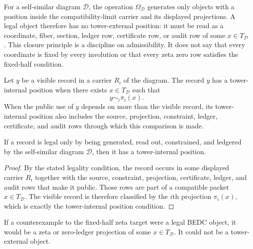 \begin{principle}
\label{prin:full-constraint-self-similar-closure}
For a self-similar diagram $\mathcal D$, the operation
$\Omega_{\mathcal D}$ generates only objects with a position inside the
compatibility-limit carrier and its displayed projections. A legal object
therefore has no tower-external position: it must be read as a coordinate,
fiber, section, ledger row, certificate row, or audit row of some
$x\in T_{\mathcal D}$. This closure principle is a discipline on
admissibility. It does not say that every coordinate is fixed by every
involution or that every zeta zero row satisfies the fixed-half condition.
\end{principle}

\begin{definition}
\label{def:tower-internal-position}
Let $y$ be a visible record in a carrier $R_i$ of the diagram. The record
$y$ has a tower-internal position when there exists $x\in T_{\mathcal D}$
such that
$$
y\sim_i\pi_i(x).
$$
When the public use of $y$ depends on more than the visible record, its
tower-internal position also includes the source, projection, constraint,
ledger, certificate, and audit rows through which this comparison is
made.
\end{definition}

\begin{theorem}
\label{thm:legal-records-tower-internal-position}
If a record is legal only by being generated, read out, constrained, and
ledgered by the self-similar diagram $\mathcal D$, then it has a
tower-internal position.
\end{theorem}

\begin{proof}
By the stated legality condition, the record occurs in some displayed
carrier $R_i$ together with the source, constraint, projection,
certificate, ledger, and audit rows that make it public. Those rows are
part of a compatible packet $x\in T_{\mathcal D}$. The visible record is
therefore classified by the $i$th projection $\pi_i(x)$, which is exactly
the tower-internal position condition.
\end{proof}

\begin{corollary}
\label{cor:legal-rh-counterexample-tower-internal}
If a counterexample to the fixed-half zeta target were a legal BEDC
object, it would be a zeta or zero-ledger projection of some
$x\in T_{\mathcal D}$. It could not be a tower-external object.
\end{corollary}

